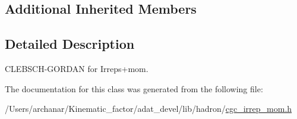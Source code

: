 \subsection*{Additional Inherited Members}


\subsection{Detailed Description}
C\+L\+E\+B\+S\+C\+H-\/\+G\+O\+R\+D\+AN for Irreps+mom. 

The documentation for this class was generated from the following file\+:\begin{DoxyCompactItemize}
\item 
/\+Users/archanar/\+Kinematic\+\_\+factor/adat\+\_\+devel/lib/hadron/\mbox{\hyperlink{lib_2hadron_2cgc__irrep__mom_8h}{cgc\+\_\+irrep\+\_\+mom.\+h}}\end{DoxyCompactItemize}

